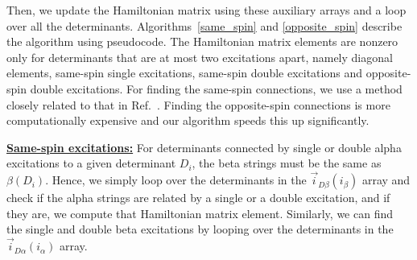 \documentclass[%
reprint,
 superscriptaddress,
 amsmath,amssymb,
 aps,
]{revtex4-1}
\def\veca{\vec{\alpha}}
\def\ia{i_\alpha}
\def\ib{i_\beta}
\def\veciDa{\vec{i}_{D\alpha}}
\def\veciDb{\vec{i}_{D\beta}}
\begin{document}
%

Then, we update the Hamiltonian matrix using these auxiliary arrays and a loop over all the determinants.
Algorithms~\ref{same_spin} and \ref{opposite_spin} describe the algorithm using pseudocode.
The Hamiltonian matrix elements are nonzero only for determinants that are at most two excitations apart,
namely diagonal elements, same-spin single excitations, same-spin double excitations and opposite-spin double excitations.
For finding the same-spin connections, we use a method closely related
to that in Ref.~\cite{SceAppGinCaf-JCoC-16}.
Finding the opposite-spin connections is more computationally expensive and our algorithm speeds this up significantly.

\noindent \underline{\bf Same-spin excitations:} For determinants connected by single or double alpha excitations to a given determinant $D_i$, the beta strings must be the same as $\beta(D_i)$.
Hence, we simply loop over the determinants in the $\veciDb(\ib)$ array and check if the alpha strings are related by a single or a double excitation,
and if they are, we compute that Hamiltonian matrix element.
Similarly, we can find the single and double beta excitations by looping over the determinants in
the $\veciDa(\ia)$ array.
\end{document}
